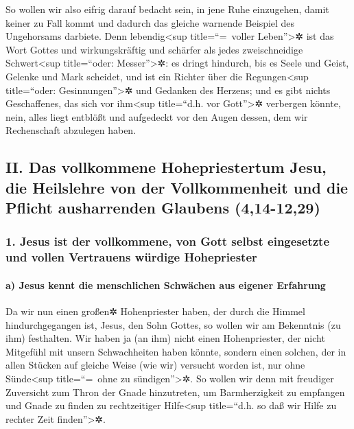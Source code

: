  So wollen wir also eifrig darauf bedacht sein, in jene
Ruhe einzugehen, damit keiner zu Fall kommt und dadurch das gleiche
warnende Beispiel des Ungehorsams darbiete.  Denn
lebendig\textless sup title=``=~voller Leben''\textgreater✲ ist das Wort
Gottes und wirkungskräftig und schärfer als jedes zweischneidige
Schwert\textless sup title=``oder: Messer''\textgreater✲: es dringt
hindurch, bis es Seele und Geist, Gelenke und Mark scheidet, und ist ein
Richter über die Regungen\textless sup title=``oder:
Gesinnungen''\textgreater✲ und Gedanken des Herzens;  und
es gibt nichts Geschaffenes, das sich vor ihm\textless sup title=``d.h.
vor Gott''\textgreater✲ verbergen könnte, nein, alles liegt entblößt und
aufgedeckt vor den Augen dessen, dem wir Rechenschaft abzulegen haben.

\hypertarget{ii.-das-vollkommene-hohepriestertum-jesu-die-heilslehre-von-der-vollkommenheit-und-die-pflicht-ausharrenden-glaubens-414-1229}{%
\subsection{II. Das vollkommene Hohepriestertum Jesu, die Heilslehre von
der Vollkommenheit und die Pflicht ausharrenden Glaubens
(4,14-12,29)}\label{ii.-das-vollkommene-hohepriestertum-jesu-die-heilslehre-von-der-vollkommenheit-und-die-pflicht-ausharrenden-glaubens-414-1229}}

\hypertarget{jesus-ist-der-vollkommene-von-gott-selbst-eingesetzte-und-vollen-vertrauens-wuxfcrdige-hohepriester}{%
\subsubsection{1. Jesus ist der vollkommene, von Gott selbst eingesetzte
und vollen Vertrauens würdige
Hohepriester}\label{jesus-ist-der-vollkommene-von-gott-selbst-eingesetzte-und-vollen-vertrauens-wuxfcrdige-hohepriester}}

\hypertarget{a-jesus-kennt-die-menschlichen-schwuxe4chen-aus-eigener-erfahrung}{%
\paragraph{a) Jesus kennt die menschlichen Schwächen aus eigener
Erfahrung}\label{a-jesus-kennt-die-menschlichen-schwuxe4chen-aus-eigener-erfahrung}}

 Da wir nun einen großen✲ Hohenpriester haben, der durch
die Himmel hindurchgegangen ist, Jesus, den Sohn Gottes, so wollen wir
am Bekenntnis (zu ihm) festhalten.  Wir haben ja (an ihm)
nicht einen Hohenpriester, der nicht Mitgefühl mit unsern Schwachheiten
haben könnte, sondern einen solchen, der in allen Stücken auf gleiche
Weise (wie wir) versucht worden ist, nur ohne Sünde\textless sup
title=``=~ohne zu sündigen''\textgreater✲.  So wollen wir
denn mit freudiger Zuversicht zum Thron der Gnade hinzutreten, um
Barmherzigkeit zu empfangen und Gnade zu finden zu rechtzeitiger
Hilfe\textless sup title=``d.h. so daß wir Hilfe zu rechter Zeit
finden''\textgreater✲.

